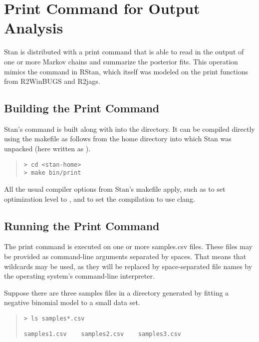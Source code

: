\chapter{Print Command for Output Analysis}\label{print-command.chapter}

Stan is distributed with a print command that is able to read in the
output of one or more Markov chains and summarize the posterior fits.
This operation mimics the  command in RStan, which
itself was modeled on the print functions from R2WinBUGS and R2jags.

\section{Building the Print Command}

Stan's  command is built along with  into the
 directory.  It can be compiled directly using the makefile
as follows from the home directory into which Stan was unpacked (here
written as ).
%
\begin{quote}
\begin{Verbatim}[fontsize=\small]
> cd <stan-home>
> make bin/print
\end{Verbatim}
\end{quote}
%
All the usual compiler options from Stan's makefile apply, such as
 to set optimization level to , and
 to set the compilation to use clang. 

\section{Running the Print Command}

The print command is executed on one or more samples.csv files.  These
files may be provided as command-line arguments separated by spaces.
That means that wildcards may be used, as they will be replaced by
space-separated file names by the operating system's command-line
interpreter. 

Suppose there are three samples files in a directory generated by
fitting a negative binomial model to a small data set.
%
\begin{quote}
\begin{Verbatim}[fontsize=\small]
> ls samples*.csv
\end{Verbatim}
\begin{Verbatim}[fontshape=sl,fontsize=\small]
samples1.csv	samples2.csv	samples3.csv
\end{Verbatim}
\end{quote}

